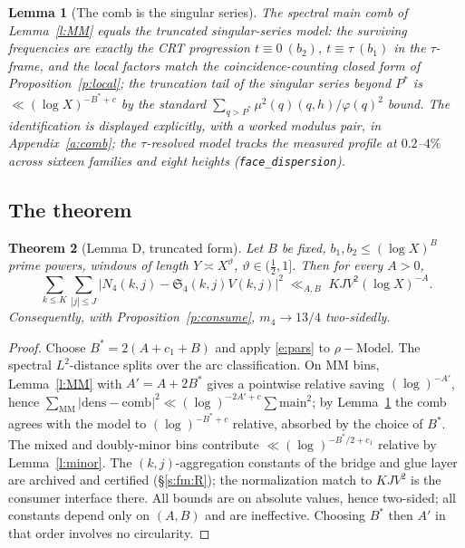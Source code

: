 \documentclass[11pt]{article}
\numberwithin{equation}{section}
\newtheorem{theorem}{Theorem}[section]
\newtheorem{lemma}[theorem]{Lemma}
\theoremstyle{definition}
\theoremstyle{remark}
\newcommand{\SSS}{\mathfrak{S}}
\begin{document}
\begin{lemma}[The comb is the singular series]\label{l:comb}
The spectral main comb of Lemma~\ref{l:MM} equals the truncated
singular-series model: the surviving frequencies are exactly the
CRT progression $t\equiv0\ (b_2)$, $t\equiv\tau\ (b_1)$ in the
$\tau$-frame, and the local factors match the
coincidence-counting closed form of Proposition~\ref{p:local};
the truncation tail of the singular series beyond $P^{*}$ is
$\ll(\log X)^{-B^{*}+c}$ by the standard
$\sum_{q>P^{*}}\mu^{2}(q)(q,h)/\varphi(q)^{2}$ bound. The
identification is displayed explicitly, with a worked modulus
pair, in Appendix~\ref{a:comb}; the $\tau$-resolved model tracks
the measured profile at $0.2$--$4\%$ across sixteen families and
eight heights (\texttt{face\_dispersion}).
\end{lemma}

\subsection{The theorem}

\begin{theorem}[Lemma D, truncated form]\label{t:D}
Let $B$ be fixed, $b_1,b_2\le(\log X)^{B}$ prime powers, windows
of length $Y\asymp X^{\vartheta}$, $\vartheta\in(\tfrac12,1]$.
Then for every $A>0$,
\[
\sum_{k\le K}\sum_{|j|\le J}
\bigl|N_4(k,j)-\SSS_4(k,j)V(k,j)\bigr|^{2}
\;\ll_{A,B}\;KJV^{2}(\log X)^{-A}.
\]
Consequently, with Proposition~\ref{p:consume}, $m_4\to13/4$
two-sidedly.
\end{theorem}

\begin{proof}
Choose $B^{*}=2(A+c_1+B)$ and apply \eqref{e:pars} to
$\rho-\mathrm{Model}$. The spectral $L^{2}$-distance splits over
the arc classification. On MM bins, Lemma~\ref{l:MM} with
$A'=A+2B^{*}$ gives a pointwise relative saving $(\log)^{-A'}$,
hence $\sum_{\mathrm{MM}}|\mathrm{dens}-\mathrm{comb}|^{2}
\ll(\log)^{-2A'+c}\sum\mathrm{main}^{2}$; by Lemma~\ref{l:comb}
the comb agrees with the model to $(\log)^{-B^{*}+c}$ relative,
absorbed by the choice of $B^{*}$. The mixed and doubly-minor
bins contribute $\ll(\log)^{-B^{*}/2+c_1}$ relative by
Lemma~\ref{l:minor}. The $(k,j)$-aggregation constants of the
bridge and glue layer are archived and certified
(\S\ref{s:fm:R}); the normalization match to $KJV^{2}$ is the
consumer interface there. All bounds are on absolute values,
hence two-sided; all constants depend only on $(A,B)$ and are
ineffective. Choosing $B^{*}$ then $A'$ in that order involves no
circularity.
\end{proof}
\end{document}
